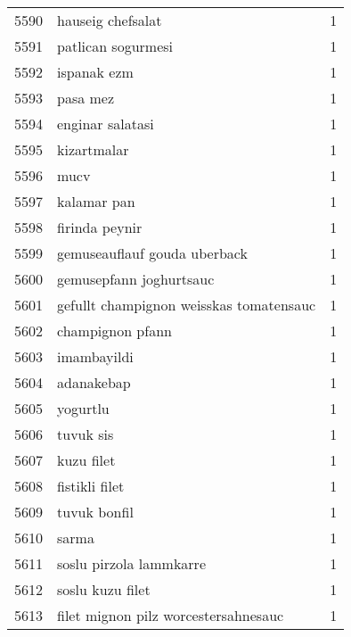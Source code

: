 \begin{tabular}{llr}
5590 &                                  hauseig chefsalat &      1 \\
5591 &                                 patlican sogurmesi &      1 \\
5592 &                                        ispanak ezm &      1 \\
5593 &                                           pasa mez &      1 \\
5594 &                                   enginar salatasi &      1 \\
5595 &                                        kizartmalar &      1 \\
5596 &                                               mucv &      1 \\
5597 &                                        kalamar pan &      1 \\
5598 &                                     firinda peynir &      1 \\
5599 &                       gemuseauflauf gouda uberback &      1 \\
5600 &                            gemusepfann joghurtsauc &      1 \\
5601 &            gefullt champignon weisskas tomatensauc &      1 \\
5602 &                                   champignon pfann &      1 \\
5603 &                                        imambayildi &      1 \\
5604 &                                         adanakebap &      1 \\
5605 &                                           yogurtlu &      1 \\
5606 &                                          tuvuk sis &      1 \\
5607 &                                         kuzu filet &      1 \\
5608 &                                     fistikli filet &      1 \\
5609 &                                       tuvuk bonfil &      1 \\
5610 &                                              sarma &      1 \\
5611 &                            soslu pirzola lammkarre &      1 \\
5612 &                                   soslu kuzu filet &      1 \\
5613 &               filet mignon pilz worcestersahnesauc &      1 \\

\end{tabular}
